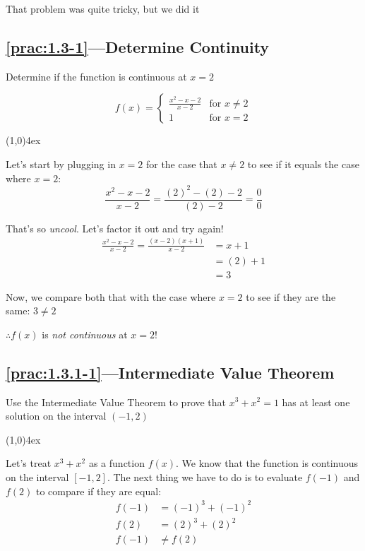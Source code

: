 \documentclass{MathNotes}
\newcommand{\br}{
	\begin{center}
		\line(1,0){4ex}
	\end{center}}
\begin{document}
That problem was quite tricky, but we did it 

\subsection*{\ref{prac:1.3-1}---Determine Continuity}\label{ans:1.3-1}
Determine if the function is continuous at $x=2$

\begin{displaymath}
	f(x) = \begin{cases}
		\frac{x^2-x-2}{x-2} & \text{for } x\neq 2 \\
		1                   & \text{for } x=2
	\end{cases}
\end{displaymath}
\br

Let's start by plugging in $x=2$ for the case that $x\neq2$ to see if it equals
the case where $x=2$:
\begin{displaymath}
	\frac{x^2-x-2}{x-2}=\frac{(2)^2-(2)-2}{(2)-2}=\frac{0}{0}
\end{displaymath}

That's so \textit{uncool}. Let's factor it out and try again!
\begin{align*}
	\frac{x^2-x-2}{x-2} = \frac{(x-2)(x+1)}{x-2} & = x+1  \\
	                                             & =(2)+1 \\
	                                             & =3
\end{align*}

Now, we compare both that with the case where $x=2$ to see if they
are the same: $3\neq2$

$\therefore f(x)$ is \textit{not continuous} at $x=2$!

\newpage
\subsection*{\ref{prac:1.3.1-1}---Intermediate Value Theorem}\label{ans:1.3.1-1}
Use the Intermediate Value Theorem to prove that $x^3+x^2=1$ has at least
one solution on the interval $(-1, 2)$
\br
Let's treat $x^3+x^2$ as a function $f(x)$. We know that the function is
continuous on the interval $[-1, 2]$. The next thing we have to do is to
evaluate $f(-1)$ and $f(2)$ to compare if they are equal:
\begin{align*}
	f(-1) & =(-1)^3+(-1)^2 \\
	f(2)  & =(2)^3+(2)^2   \\
	f(-1) & \neq f(2)      \\
\end{align*}
\end{document}
